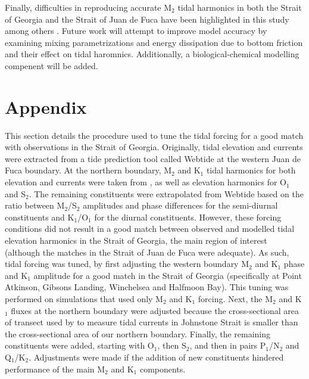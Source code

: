 \documentclass[pdftex,10pt]{article}
\begin{document}
Finally, difficulties in reproducing accurate M$_2$ tidal harmonics in both the Strait of Georgia and the Strait of Juan de Fuca have been highlighted in this study among others \citep{stronach1993update, foreman2004m}. Future work will attempt to improve model accuracy by examining mixing parametrizations and energy dissipation due to bottom friction and their effect on tidal haromnics. Additionally, a biological-chemical modelling compenent will be added. 



\appendix
\section{Appendix}\label{sec:appendix}
This section details the procedure used to tune the tidal forcing for a good match with observations in the Strait of Georgia. Originally, tidal elevation and currents were extracted from a tide prediction tool called Webtide \citep{foreman2000webtide} at the western Juan de Fuca boundary. At the northern boundary,  M$_2$ and K$_1$ tidal harmonics for both elevation and currents were taken from \citet{thomson1980johnstone}, as well as elevation harmonics for O$_1$ and S$_2$. The remaining constituents were extrapolated from Webtide based on the ratio between M$_2$/S$_2$ amplitudes and phase differences for the semi-diurnal constituents and K$_1$/O$_1$ for the diurnal constituents. However, these forcing conditions did not result in a good match between observed and modelled tidal elevation harmonics in the Strait of Georgia, the main region of interest (although the matches in the Strait of Juan de Fuca were adequate). As such, tidal forcing was tuned, by first adjusting the western boundary M$_2$ and K$_1$ phase and K$_1$ amplitude for a good match in the Strait of Georgia (specifically at Point Atkinson, Gibsons Landing, Winchelsea and Halfmoon Bay). This tuning was performed on simulations that used only M$_2$ and K$_1$ forcing. Next, the M$_2$ and K$_1$ fluxes at the northern boundary were adjusted because the cross-sectional area of transect used by \citet{thomson1980johnstone} to measure tidal currents in Johnstone Strait is smaller than the cross-sectional area of our northern boundary. Finally, the remaining constituents were added, starting with O$_1$, then S$_2$, and then in pairs P$_1$/N$_2$ and Q$_1$/K$_2$. Adjustments were made if the addition of new constituents hindered performance of the main M$_2$ and K$_1$ components.
\end{document}
